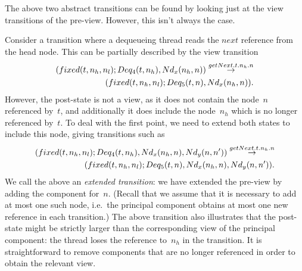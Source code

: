 The above two abstract transitions can be found by looking just at the view
transitions of the pre-view.  However, this isn't always the case.

Consider a transition where a dequeueing thread reads the $next$ reference
from the head node.  This can be partially described by the view transition
\[
\begin{align}
(fixed(t, n_h, n_l); Deq_4(t, n_h), Nd_x(n_h, n))
  \stackrel{getNext.t.n_h.n}\rightarrow \\
\qquad (fixed(t, n_h, n_l); Deq_5(t, n), Nd_x(n_h, n)).
\end{align}
\]
However, the post-state is not a view, as it does not contain the node~$n$
referenced by~$t$, and additionally it does include the node~$n_h$ which is no
longer referenced by~$t$.  To deal with the first point, we need to extend
both states to include this node, giving transitions such as
\begin{equation}
\begin{align}
(fixed(t, n_h, n_l); Deq_4(t, n_h), Nd_x(n_h, n), Nd_y(n, n'))
  \stackrel{getNext.t.n_h.n}\rightarrow \\
\qquad (fixed(t, n_h, n_l);   Deq_5(t, n), Nd_x(n_h, n), Nd_y(n, n')).
\label{trans:getNext}
\end{align}
\end{equation}
%
%
%
We call the above an \emph{extended transition}: we have extended the pre-view
by adding the component for~$n$.  (Recall that we assume that it is necessary
to add at most one such node, i.e.~the principal component obtains at most one
new reference in each transition.)  The above transition also illustrates that
the post-state might be strictly larger than the corresponding view of the
principal component: the thread loses the reference to~$n_h$ in the
transition.  It is straightforward to remove components that are no longer
referenced in order to obtain the relevant view.

